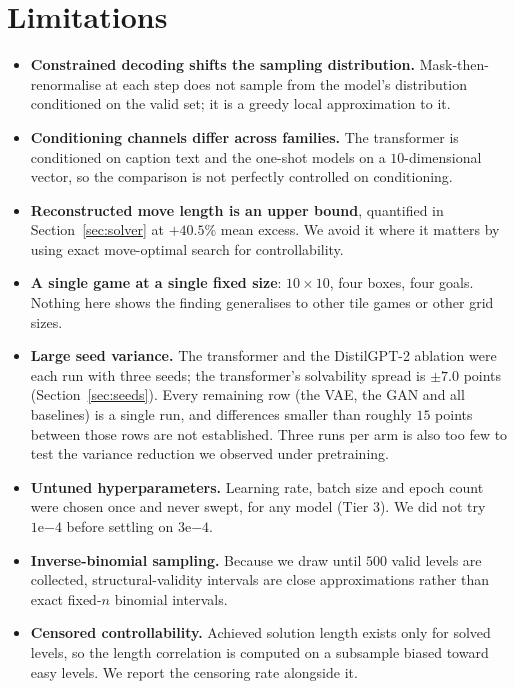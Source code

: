 \documentclass[conference]{IEEEtran}
\begin{document}
\section{Limitations}

\begin{itemize}
\item \textbf{Constrained decoding shifts the sampling distribution.}
      Mask-then-renormalise at each step does not sample from the model's
      distribution conditioned on the valid set; it is a greedy local
      approximation to it.
\item \textbf{Conditioning channels differ across families.} The transformer is
      conditioned on caption text and the one-shot models on a $10$-dimensional
      vector, so the comparison is not perfectly controlled on conditioning.
\item \textbf{Reconstructed move length is an upper bound}, quantified in
      Section~\ref{sec:solver} at $+40.5\%$ mean excess. We avoid it where it
      matters by using exact move-optimal search for controllability.
\item \textbf{A single game at a single fixed size}: $10\times10$, four boxes,
      four goals. Nothing here shows the finding generalises to other tile games
      or other grid sizes.
\item \textbf{Large seed variance.} The transformer and the DistilGPT-2
      ablation were each run with three seeds; the transformer's solvability
      spread is $\pm 7.0$ points (Section~\ref{sec:seeds}). Every remaining row
      (the VAE, the GAN and all baselines) is a single run, and
      differences smaller than roughly $15$ points between those rows are not
      established. Three runs per arm is also too few to test the variance
      reduction we observed under pretraining.
\item \textbf{Untuned hyperparameters.} Learning rate, batch size and epoch count
      were chosen once and never swept, for any model (Tier 3). We did not try
      $1\mathrm{e}{-4}$ before settling on $3\mathrm{e}{-4}$.
\item \textbf{Inverse-binomial sampling.} Because we draw until $500$ valid
      levels are collected, structural-validity intervals are close
      approximations rather than exact fixed-$n$ binomial intervals.
\item \textbf{Censored controllability.} Achieved solution length exists only for
      solved levels, so the length correlation is computed on a subsample biased
      toward easy levels. We report the censoring rate alongside it.
\end{itemize}
\end{document}
